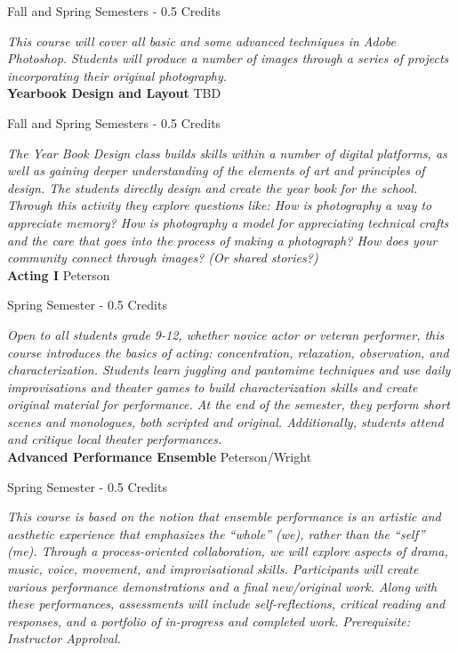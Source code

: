 \noindent Fall and Spring Semesters - 0.5 Credits

\vspace{1mm}\emph{This course will cover all basic and some advanced techniques in Adobe Photoshop. Students will produce a number of images through a series of projects incorporating their original photography.}\\

\noindent\textbf{Yearbook Design and Layout} \hfill TBD

\noindent Fall and Spring Semesters - 0.5 Credits

\vspace{1mm}\emph{The Year Book Design class builds skills within a number of digital platforms, as well as gaining deeper understanding of the elements of art and principles of design. The students directly design and create the year book for the school. Through this activity they explore questions like: How is photography a way to appreciate memory? How is photography a model for appreciating technical crafts and the care that goes into the process of making a photograph? How does your community connect through images? (Or shared stories?)}\\

\noindent\textbf{Acting I} \hfill Peterson

\noindent Spring Semester - 0.5 Credits

\vspace{1mm}\emph{Open to all students grade 9-12, whether novice actor or veteran performer, this course introduces the basics of acting: concentration, relaxation, observation, and characterization. Students learn juggling and pantomime techniques and use daily improvisations and theater games to build characterization skills and create original material for performance. At the end of the semester, they perform short scenes and monologues, both scripted and original. Additionally, students attend and critique local theater performances.}\\

\noindent\textbf{Advanced Performance Ensemble} \hfill Peterson/Wright

\noindent Spring Semester - 0.5 Credits

\vspace{1mm}\emph{This course is based on the notion that ensemble performance is an artistic and aesthetic experience that emphasizes the “whole” (we), rather than the “self” (me). Through a process-oriented collaboration, we will explore aspects of drama, music, voice, movement, and improvisational skills. Participants will create various performance demonstrations and a final new/original work. Along with these performances, assessments will include self-reflections, critical reading and responses, and a portfolio of in-progress and completed work. Prerequisite: Instructor Approlval.}\\

